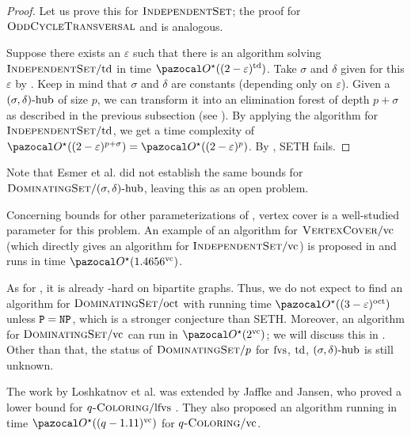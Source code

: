 \begin{proof}
    Let us prove this for $\textsc{IndependentSet}$; the proof for $\textsc{OddCycleTransversal}$ and  is analogous.

    Suppose there exists an $\varepsilon$ such that there is an algorithm solving $\textsc{IndependentSet}/\text{td}$ in time $\O^\star((2 - \varepsilon)^\td)$. Take $\sigma$ and $\delta$ given for this $\varepsilon$ by . Keep in mind that $\sigma$ and $\delta$ are constants (depending only on $\varepsilon$). Given a $(\sigma, \delta)\text{-hub}$ of size $p$, we can transform it into an elimination forest of depth $p + \sigma$ as described in the previous subsection (see ). By applying the algorithm for $\textsc{IndependentSet}/\text{td}$, we get a time complexity of $\O^\star((2 - \varepsilon)^{p + \sigma}) = \O^\star((2 - \varepsilon)^p)$. By , SETH fails.
\end{proof}

Note that Esmer et al. did not establish the same bounds for $\textsc{DominatingSet}/(\sigma, \delta)\text{-hub}$, leaving this as an open problem.

\medskip

Concerning bounds for other parameterizations of , vertex cover is a well-studied parameter for this problem. An example of an algorithm for $\textsc{VertexCover}/\text{vc}$ (which directly gives an algorithm for $\textsc{IndependentSet}/\text{vc}$) is proposed in \cite[Theorem 3.2]{cygan2015parameterized} and runs in time $\O^\star(1.4656^\vc)$.

\medskip

As for , it is already \NP-hard on bipartite graphs. Thus, we do not expect to find an algorithm for $\textsc{DominatingSet}/\text{oct}$  with running time $\O^\star((3-\varepsilon)^\oct)$ unless $\texttt{P} = \texttt{NP}$, which is a stronger conjecture than SETH. Moreover, an algorithm for $\textsc{DominatingSet}/\text{vc}$ can run in $\O^\star(2^\vc)$; we will discuss this in . Other than that, the status of $\textsc{DominatingSet}/p$ for $\text{fvs}$, $\text{td}$, $(\sigma, \delta)\text{-hub}$ is still unknown.

\medskip

The work by Loshkatnov et al. \cite{lokshtanov2011known} was extended by Jaffke and Jansen, who proved a lower bound for $q\textsc{-Coloring}/\text{lfvs}$ \cite{jaffke2017fine}. They also proposed an algorithm running in time $\O^\star((q - 1.11)^\vc)$ for $q\textsc{-Coloring}/\text{vc}$.

